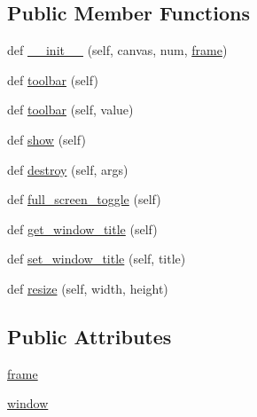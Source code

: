 \subsection*{Public Member Functions}
\begin{DoxyCompactItemize}
\item 
def \hyperlink{classmatplotlib_1_1backends_1_1backend__wx_1_1FigureManagerWx_a9099efe4348a0370ef6a3c3386316dd4}{\+\_\+\+\_\+init\+\_\+\+\_\+} (self, canvas, num, \hyperlink{classmatplotlib_1_1backends_1_1backend__wx_1_1FigureManagerWx_a403c62eb0bb13107cef40b7e0004f5dd}{frame})
\item 
def \hyperlink{classmatplotlib_1_1backends_1_1backend__wx_1_1FigureManagerWx_af7923804ba21266ef2b47fc50ea9a7d2}{toolbar} (self)
\item 
def \hyperlink{classmatplotlib_1_1backends_1_1backend__wx_1_1FigureManagerWx_a55bef42581f3875bac6db881ae06686a}{toolbar} (self, value)
\item 
def \hyperlink{classmatplotlib_1_1backends_1_1backend__wx_1_1FigureManagerWx_a08293c883e323316253785edfdc2b81b}{show} (self)
\item 
def \hyperlink{classmatplotlib_1_1backends_1_1backend__wx_1_1FigureManagerWx_a6f070b117235bdeb0671bd7e2bb36a07}{destroy} (self, args)
\item 
def \hyperlink{classmatplotlib_1_1backends_1_1backend__wx_1_1FigureManagerWx_a5bd9e1cf5c7da05f12946e0f573f4676}{full\+\_\+screen\+\_\+toggle} (self)
\item 
def \hyperlink{classmatplotlib_1_1backends_1_1backend__wx_1_1FigureManagerWx_a66949da24b52d99451f98d19b939fd1f}{get\+\_\+window\+\_\+title} (self)
\item 
def \hyperlink{classmatplotlib_1_1backends_1_1backend__wx_1_1FigureManagerWx_aa9ec5ccf599da53cb1625213031c940a}{set\+\_\+window\+\_\+title} (self, title)
\item 
def \hyperlink{classmatplotlib_1_1backends_1_1backend__wx_1_1FigureManagerWx_a7350633d87a1e41c4f0b79b852cc48d4}{resize} (self, width, height)
\end{DoxyCompactItemize}
\subsection*{Public Attributes}
\begin{DoxyCompactItemize}
\item 
\hyperlink{classmatplotlib_1_1backends_1_1backend__wx_1_1FigureManagerWx_a403c62eb0bb13107cef40b7e0004f5dd}{frame}
\item 
\hyperlink{classmatplotlib_1_1backends_1_1backend__wx_1_1FigureManagerWx_abefea8f4ab08467faba7e0c993ac1231}{window}
\end{DoxyCompactItemize}


